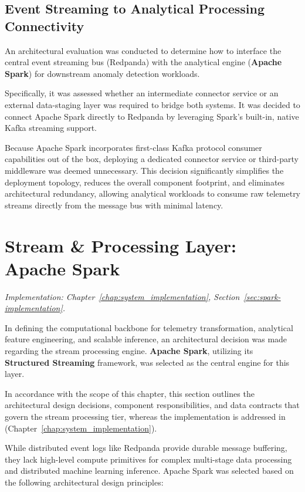 \subsection{Event Streaming to Analytical Processing Connectivity}

An architectural evaluation was conducted to determine how to interface the central event streaming bus (Redpanda) with the analytical engine (\textbf{Apache Spark}) for downstream anomaly detection workloads.

Specifically, it was assessed whether an intermediate connector service or an external data-staging layer was required to bridge both systems.
It was decided to connect Apache Spark directly to Redpanda by leveraging Spark's built-in, native Kafka streaming support.

Because Apache Spark incorporates first-class Kafka protocol consumer capabilities out of the box, deploying a dedicated connector service or third-party middleware was deemed unnecessary.
This decision significantly simplifies the deployment topology, reduces the overall component footprint, and eliminates architectural redundancy, allowing analytical workloads to consume raw telemetry streams directly from the message bus with minimal latency.

\section{Stream \& Processing Layer: Apache Spark}
\label{sec:spark-stream-processing}
\textit{Implementation: Chapter~\ref{chap:system_implementation}, Section~\ref{sec:spark-implementation}.}

In defining the computational backbone for telemetry transformation, analytical feature engineering, and scalable inference, an architectural decision was made regarding the stream processing engine.
\textbf{Apache Spark}, utilizing its \textbf{Structured Streaming} framework, was selected as the central engine for this layer.

In accordance with the scope of this chapter, this section outlines the architectural design decisions, component responsibilities, and data contracts that govern the stream processing tier, whereas the implementation is addressed in (Chapter~\ref{chap:system_implementation}).

While distributed event logs like Redpanda provide durable message buffering, they lack high-level compute primitives for complex multi-stage data processing and distributed machine learning inference.
Apache Spark was selected based on the following architectural design principles:

